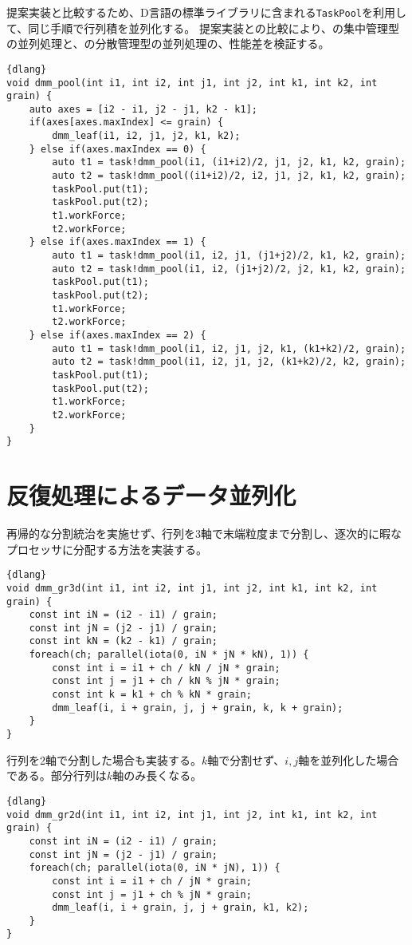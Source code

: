 \documentclass[10pt,a4paper]{book}
\begin{document}
提案実装と比較するため、D言語の標準ライブラリに含まれる\texttt{TaskPool}を利用して、同じ手順で行列積を並列化する。
提案実装との比較により、の集中管理型の並列処理と、の分散管理型の並列処理の、性能差を検証する。

\begin{Verbatim}{dlang}
void dmm_pool(int i1, int i2, int j1, int j2, int k1, int k2, int grain) {
	auto axes = [i2 - i1, j2 - j1, k2 - k1];
	if(axes[axes.maxIndex] <= grain) {
		dmm_leaf(i1, i2, j1, j2, k1, k2);
	} else if(axes.maxIndex == 0) {
		auto t1 = task!dmm_pool(i1, (i1+i2)/2, j1, j2, k1, k2, grain);
		auto t2 = task!dmm_pool((i1+i2)/2, i2, j1, j2, k1, k2, grain);
		taskPool.put(t1);
		taskPool.put(t2);
		t1.workForce;
		t2.workForce;
	} else if(axes.maxIndex == 1) {
		auto t1 = task!dmm_pool(i1, i2, j1, (j1+j2)/2, k1, k2, grain);
		auto t2 = task!dmm_pool(i1, i2, (j1+j2)/2, j2, k1, k2, grain);
		taskPool.put(t1);
		taskPool.put(t2);
		t1.workForce;
		t2.workForce;
	} else if(axes.maxIndex == 2) {
		auto t1 = task!dmm_pool(i1, i2, j1, j2, k1, (k1+k2)/2, grain);
		auto t2 = task!dmm_pool(i1, i2, j1, j2, (k1+k2)/2, k2, grain);
		taskPool.put(t1);
		taskPool.put(t2);
		t1.workForce;
		t2.workForce;
	}
}
\end{Verbatim}

\section{反復処理によるデータ並列化\label{sect:dmm:grid}}

再帰的な分割統治を実施せず、行列を3軸で末端粒度まで分割し、逐次的に暇なプロセッサに分配する方法を実装する。

\begin{Verbatim}{dlang}
void dmm_gr3d(int i1, int i2, int j1, int j2, int k1, int k2, int grain) {
	const int iN = (i2 - i1) / grain;
	const int jN = (j2 - j1) / grain;
	const int kN = (k2 - k1) / grain;
	foreach(ch; parallel(iota(0, iN * jN * kN), 1)) {
		const int i = i1 + ch / kN / jN * grain;
		const int j = j1 + ch / kN % jN * grain;
		const int k = k1 + ch % kN * grain;
		dmm_leaf(i, i + grain, j, j + grain, k, k + grain);
	}
}
\end{Verbatim}

行列を2軸で分割した場合も実装する。$k$軸で分割せず、$i,j$軸を並列化した場合である。部分行列は$k$軸のみ長くなる。

\begin{Verbatim}{dlang}
void dmm_gr2d(int i1, int i2, int j1, int j2, int k1, int k2, int grain) {
	const int iN = (i2 - i1) / grain;
	const int jN = (j2 - j1) / grain;
	foreach(ch; parallel(iota(0, iN * jN), 1)) {
		const int i = i1 + ch / jN * grain;
		const int j = j1 + ch % jN * grain;
		dmm_leaf(i, i + grain, j, j + grain, k1, k2);
	}
}
\end{Verbatim}
\end{document}
